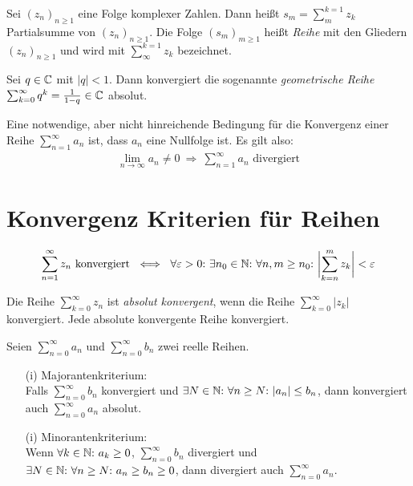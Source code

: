 \begin{frameddefn}[Reihendefinition]
	Sei $(z_n)_{n\geq 1}$ eine Folge komplexer Zahlen. Dann heißt $s_m = \sum_{m}^{k=1} z_k$ Partialsumme von $(z_n)_{n\geq 1}$. Die Folge $(s_m)_{m\geq 1}$ heißt \textit{Reihe} mit den Gliedern $(z_n)_{n\geq 1}$ und wird mit $\sum_{\infty}^{k=1} z_k$ bezeichnet.
\end{frameddefn}

\begin{framedthm}
	Sei $q \in \mathbb{C}$ mit $|q| < 1$. Dann konvergiert die sogenannte \textit{geometrische Reihe} $\sum_{k=0}^{\infty} q^k = \frac{1}{1-q} \in \mathbb{C}$ absolut.
\end{framedthm}

\begin{framedthm}
	Eine notwendige, aber nicht hinreichende Bedingung für die Konvergenz einer Reihe $\sum_{n=1}^{\infty} a_n$ ist, dass $a_n$ eine Nullfolge ist. Es gilt also:
	\begin{align*}
		\lim_{n \to \infty} a_n \neq 0 \ \Rightarrow\ \sum_{n=1}^{\infty} a_n \textrm{ divergiert}
	\end{align*}
\end{framedthm}

\section{Konvergenz Kriterien für Reihen}

\begin{framedthm}
	\begin{align*}
		\sum_{n=1}^{\infty} z_n \textrm{ konvergiert} \ \iff\  \forall \varepsilon > 0{:}\ \exists n_0 \in \mathbb{N}{:}\  \forall n,m \geq n_0{:}\  \biggl|\sum_{k=n}^{m} z_k \biggr| < \varepsilon
	\end{align*}
\end{framedthm}

\begin{frameddefn}
	Die Reihe $\sum_{k=0}^{\infty} z_n$ ist \textit{absolut konvergent}, wenn die Reihe $\sum_{k=0}^{\infty} |z_k|$ konvergiert. Jede absolute konvergente Reihe konvergiert.
\end{frameddefn}

\begin{framedthm} \label{majok}
	Seien $\sum_{n=0}^{\infty} a_n$ und $\sum_{n=0}^{\infty} b_n$ zwei reelle Reihen.
	\begin{enumerate}
		\item[(i)] Majorantenkriterium:\\ Falls $\sum_{n=0}^{\infty} b_n$ konvergiert und $\exists N \in \mathbb{N}{:}\ \forall n \geq N{:}\  |a_n| \leq b_n$, dann konvergiert auch $\sum_{n=0}^{\infty} a_n$ absolut.
		\item[(i)] Minorantenkriterium:\\ Wenn $\forall k \in \mathbb{N}{:}\  a_k \geq 0$, $\sum_{n=0}^{\infty} b_n$ divergiert und $\exists N \in \mathbb{N}{:}\ \forall n \geq N{:}\  a_n \geq b_n \geq 0$, dann divergiert auch $\sum_{n=0}^{\infty} a_n$.
	\end{enumerate}
\end{framedthm}

